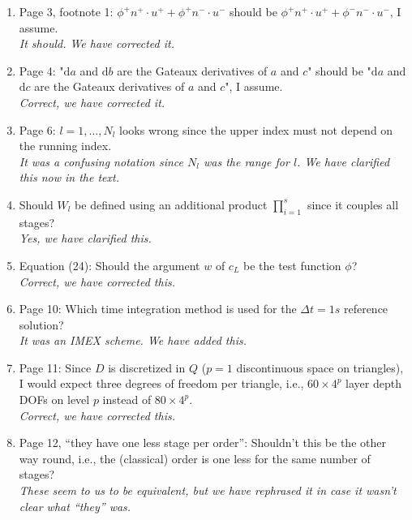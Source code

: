 \documentclass[a4paper,12pt]{article}
\newcommand{\colin}[1]{{\color{blue}CJC says: #1}}
\begin{document}
\begin{enumerate}
\item Page 3, footnote 1: $\phi^+ n^+ \cdot u^+ + \phi^+ n^- \cdot u^-$ should be $\phi^+ n^+ \cdot u^+ + \phi^- n^- \cdot u^-$, I assume.\\
  \emph{It should. We have corrected it.}
\item Page 4: "$\mathrm{d}a$ and $\mathrm{d}b$ are the Gateaux derivatives of $a$ and $c$" should be "$\mathrm{d}a$ and $\mathrm{d}c$ are the Gateaux derivatives of $a$ and $c$", I assume.\\
  \emph{Correct, we have corrected it.}
\item Page 6: $l = 1, \dots, N_l$ looks wrong since the upper index
  must not depend on the running index.\\ \emph{It was a confusing
  notation since $N_l$ was the range for $l$. We have clarified this
  now in the text.}
\item Should $W_l$ be defined using an additional product $\prod_{i=1}^s$ since it couples all stages?\\
  \emph{Yes, we have clarified  this.}
\item Equation (24): Should the argument $w$ of $c_L$ be the test function $\phi$?\\
  \emph{Correct, we have corrected this.}
\item Page 10: Which time integration method is used for the $\Delta t = 1s$ reference solution?\\
\emph{It was an IMEX scheme. We have added this.}
\item Page 11: Since $D$ is discretized in $Q$ ($p = 1$ discontinuous
  space on triangles), I would expect three degrees of freedom per
  triangle, i.e., $60 \times 4^p$ layer depth DOFs on level $p$
  instead of $80 \times 4^p$.\\
  \emph{Correct, we have corrected this.}
\item Page 12, ``they have one less stage per order'': Shouldn't this be the other way round, i.e., the (classical) order is one less for the same number of stages?~\\
  \emph{These seem to us to be equivalent, but we have rephrased it in case
  it wasn't clear what ``they'' was.}
\end{enumerate}
\end{document}
